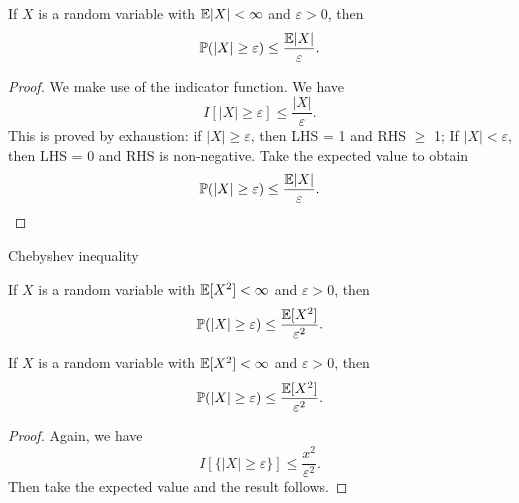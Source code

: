 %
\begin{note}
  \begin{field}
    \begin{thm}
      If $X$ is a random variable with $\mathbb{E}|X| < \infty$ and $\varepsilon > 0$, then
      \[
        \mathbb{P}(|X| \geq \varepsilon) \leq \frac{\mathbb{E}|X|}{\varepsilon}.
      \]
    \end{thm}
  \end{field}
  \begin{field}
    \begin{proof}
      We make use of the indicator function. We have
      \[
        I[|X|\geq \varepsilon] \leq \frac{|X|}{\varepsilon}.
      \]
      This is proved by exhaustion: if $|X| \geq \varepsilon$, then LHS = 1 and RHS $\geq$ 1; If $|X| < \varepsilon$, then LHS = 0 and RHS is non-negative.
      Take the expected value to obtain
      \[
        \mathbb{P}(|X| \geq \varepsilon) \leq \frac{\mathbb{E} |X|}{\varepsilon}.\qedhere
      \]
    \end{proof}
  \end{field}
  \xplain{}%
\end{note}

%
\begin{note}
  \begin{field}
    Chebyshev inequality
  \end{field}
  \begin{field}
    \begin{thm}
      If $X$ is a random variable with $\mathbb{E}[X^2] < \infty$ and $\varepsilon > 0$, then
      \[
        \mathbb{P}(|X| \geq \varepsilon) \leq \frac{\mathbb{E}[X^2]}{\varepsilon^2}.
      \]
    \end{thm}
  \end{field}
  \xplain{}%
\end{note}

%
\begin{note}
  \begin{field}
    \begin{thm}
      If $X$ is a random variable with $\mathbb{E}[X^2] < \infty$ and $\varepsilon > 0$, then
      \[
        \mathbb{P}(|X| \geq \varepsilon) \leq \frac{\mathbb{E}[X^2]}{\varepsilon^2}.
      \]
    \end{thm}
  \end{field}
  \begin{field}
    \begin{proof}
      Again, we have
      \[
        I[\{|X|\geq \varepsilon\}] \leq \frac{x^2}{\varepsilon^2}.
      \]
      Then take the expected value and the result follows.
    \end{proof}
  \end{field}
  \xplain{}%
\end{note}

